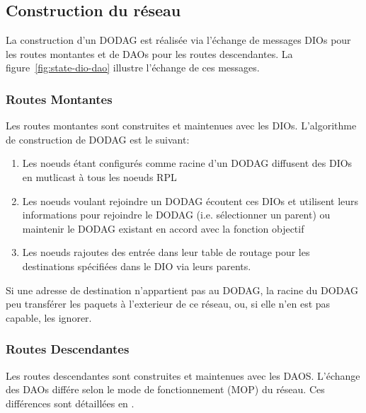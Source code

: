 \subsection*{Construction du réseau}
    La construction d'un DODAG est réalisée via l'échange de messages DIOs pour les routes montantes et de DAOs pour les routes descendantes. La figure~\ref{fig:state-dio-dao} illustre l'échange de ces messages.

\subsubsection*{Routes Montantes}
    Les routes montantes sont construites et maintenues avec les DIOs.
    L'algorithme de construction de DODAG est le suivant:
    \begin{enumerate}
        \item Les noeuds étant configurés comme racine d'un DODAG diffusent des DIOs en mutlicast à tous les noeuds RPL
        \item Les noeuds voulant rejoindre un DODAG écoutent ces DIOs et utilisent leurs informations pour rejoindre le DODAG (i.e. sélectionner un parent) ou maintenir le DODAG existant en accord avec la fonction objectif
        \item Les noeuds rajoutes des entrée dans leur table de routage pour les destinations spécifiées dans le DIO via leurs parents.
    \end{enumerate}

    Si une adresse de destination n'appartient pas au DODAG, la racine du DODAG peu transférer les paquets à l'exterieur de ce réseau, ou, si elle n'en est pas capable, les ignorer.     

\subsubsection*{Routes Descendantes}
    Les routes descendantes sont construites et maintenues avec les DAOS.
    L'échange des DAOs différe selon le mode de fonctionnement (MOP) du réseau. Ces différences sont détaillées en .

